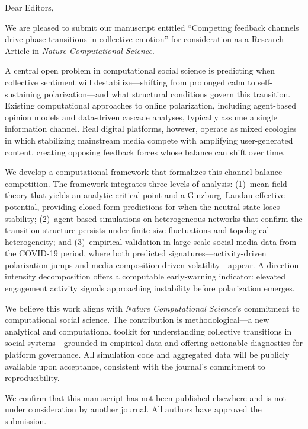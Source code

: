 \documentclass[11pt]{article}
\begin{document}
Dear Editors,

We are pleased to submit our manuscript entitled ``Competing feedback channels drive phase transitions in collective emotion'' for consideration as a Research Article in \textit{Nature Computational Science}.

A central open problem in computational social science is predicting when collective sentiment will destabilize---shifting from prolonged calm to self-sustaining polarization---and what structural conditions govern this transition. Existing computational approaches to online polarization, including agent-based opinion models and data-driven cascade analyses, typically assume a single information channel. Real digital platforms, however, operate as mixed ecologies in which stabilizing mainstream media compete with amplifying user-generated content, creating opposing feedback forces whose balance can shift over time.

We develop a computational framework that formalizes this channel-balance competition. The framework integrates three levels of analysis: (1)~mean-field theory that yields an analytic critical point and a Ginzburg--Landau effective potential, providing closed-form predictions for when the neutral state loses stability; (2)~agent-based simulations on heterogeneous networks that confirm the transition structure persists under finite-size fluctuations and topological heterogeneity; and (3)~empirical validation in large-scale social-media data from the COVID-19 period, where both predicted signatures---activity-driven polarization jumps and media-composition-driven volatility---appear. A direction--intensity decomposition offers a computable early-warning indicator: elevated engagement activity signals approaching instability before polarization emerges.

We believe this work aligns with \textit{Nature Computational Science}'s commitment to computational social science. The contribution is methodological---a new analytical and computational toolkit for understanding collective transitions in social systems---grounded in empirical data and offering actionable diagnostics for platform governance. All simulation code and aggregated data will be publicly available upon acceptance, consistent with the journal's commitment to reproducibility.

We confirm that this manuscript has not been published elsewhere and is not under consideration by another journal. All authors have approved the submission.
\end{document}
